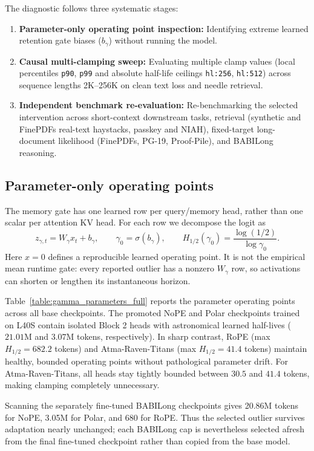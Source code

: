 The diagnostic follows three systematic stages:
\begin{enumerate}
  \item \textbf{Parameter-only operating point inspection:} Identifying extreme learned retention gate biases ($b_\gamma$) without running the model.
  \item \textbf{Causal multi-clamping sweep:} Evaluating multiple clamp values (local percentiles \texttt{p90}, \texttt{p99} and absolute half-life ceilings \texttt{hl:256}, \texttt{hl:512}) across sequence lengths 2K--256K on clean text loss and needle retrieval.
  \item \textbf{Independent benchmark re-evaluation:} Re-benchmarking the selected intervention across short-context downstream tasks, retrieval (synthetic and FinePDFs real-text haystacks, passkey and NIAH), fixed-target long-document likelihood (FinePDFs, PG-19, Proof-Pile), and BABILong reasoning.
\end{enumerate}

\subsection{Parameter-only operating points}
The memory gate has one learned row per query/memory head, rather than one scalar per attention KV head. For each row we decompose the logit as
\begin{equation}
 z_{\gamma,t}=W_\gamma x_t+b_\gamma,\qquad
 \gamma_0=\sigma(b_\gamma),\qquad
 H_{1/2}(\gamma_0)=\frac{\log(1/2)}{\log\gamma_0}.
\end{equation}
Here $x=0$ defines a reproducible learned operating point. It is not the empirical mean runtime gate: every reported outlier has a nonzero $W_\gamma$ row, so activations can shorten or lengthen its instantaneous horizon.

Table~\ref{table:gamma_parameters_full} reports the parameter operating points across all base checkpoints. The promoted NoPE and Polar checkpoints trained on L40S contain isolated Block 2 heads with astronomical learned half-lives ($21.01$M and $3.07$M tokens, respectively). In sharp contrast, RoPE (max $H_{1/2} = 682.2$ tokens) and Atma-Raven-Titans (max $H_{1/2} = 41.4$ tokens) maintain healthy, bounded operating points without pathological parameter drift. For Atma-Raven-Titans, all heads stay tightly bounded between $30.5$ and $41.4$ tokens, making clamping completely unnecessary.

Scanning the separately fine-tuned BABILong checkpoints gives 20.86M tokens for NoPE, 3.05M for Polar, and 680 for RoPE. Thus the selected outlier survives adaptation nearly unchanged; each BABILong cap is nevertheless selected afresh from the final fine-tuned checkpoint rather than copied from the base model.


